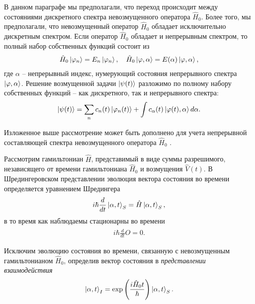 \begin{subappendices}
В данном параграфе мы предполагали, что переход происходит между состояниями дискретного спектра невозмущенного оператора $\hat{H}_0$. Более того, мы предполагали, что невозмущенный оператор $\hat{H}_0$ обладает исключительно дискретным спектром. Если оператор $\hat{H}_0$ обладает и непрерывным спектром, то полный набор собственных функций состоит из
\begin{gather}
    \hat{H}_0 \ket{\varphi_n} = E_n \ket{\varphi_n}, \quad \hat{H}_0 \ket{\varphi, \alpha} = E(\alpha) \ket{\varphi, \alpha},
\end{gather}
где $\alpha$ -- непрерывный индекс, нумерующий состояния непрерывного спектра $\ket{\varphi, \alpha}$. Решение возмущенной задачи $\ket{\psi(t)}$ разложимо по полному набору собственных функций -- как дискретного, так и непрерывного спектра:
\begin{gather}
    \ket{\psi(t)} = \sum_n c_n(t) \ket{\varphi_n(t)} + \int c_\alpha(t) \ket{\varphi(t), \alpha} d\alpha.
\end{gather}

Изложенное выше рассмотрение может быть дополнено для учета непрерывной составляющей спектра невозмущенного оператора $\hat{H}_0$ \cite{greiner}. 

\end{subappendices}

\iffalse
Рассмотрим гамильтониан $\hat{H}$, представимый в виде суммы разрешимого, независящего от времени гамильтониана $\hat{H}_0$ и возмущения $\hat{V}(t)$. В Шредингеровском представлении эволюция вектора состояния во времени определяется уравнением Шредингера
\begin{gather}
    i \hbar \frac{d}{dt} \ket{\alpha, t}_S = \hat{H} \ket{\alpha, t}_S,
\end{gather}
в то время как наблюдаемы стационарны во времени 
\begin{gather}
    i \hbar \frac{d}{dt} \hat{O} = 0.
\end{gather}

Исключим эволюцию состояния во времени, связанную с невозмущенным гамильтонианом $\hat{H}_0$, определив вектор состояния в \textit{представлении взаимодействия} 
\begin{gather}
    \ket{\alpha, t}_I = \exp \left( \frac{i \hat{H}_0 t}{\hbar} \right) \ket{\alpha, t}_S. 
\end{gather}

